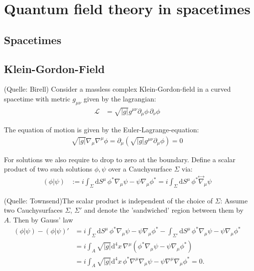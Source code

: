 \chapter{Quantum field theory in spacetimes}
\section{Spacetimes}

\section{Klein-Gordon-Field}
(Quelle: Birell)
Consider a massless complex Klein-Gordon-field in a curved spacetime with metric \(g_{\mu\nu}\) given by the lagrangian:
\begin{align}
\mathcal{L} &= \sqrt{|g|} g^{\mu\nu} \partial_\mu \phi\,\partial_\nu \phi 
\end{align}

The equation of motion is given by the Euler-Lagrange-equation:
\begin{align}
\sqrt{|g|}\nabla_\mu\nabla^\mu \phi = \partial_\mu \left(\sqrt{|g|} g^{\mu\nu} \partial_\mu \phi\right) = 0
\end{align}

For solutions we also require to drop to zero at the boundary. Define a scalar product of two such solutions $\phi, \psi$ over a Cauchysurface \(\Sigma\) via:
\begin{align}
(\phi|\psi) &:= i \int_{\Sigma} \mathrm{d}S^\mu\, \phi^*\nabla_\mu \psi - \psi\nabla_\mu \phi^* = i \int_{\Sigma} \mathrm{d}S^\mu\, \phi^*\overset{\leftrightarrow}{\nabla}_\mu \psi
\end{align}

(Quelle: Townsend)The scalar product is independent of the choice of \(\Sigma\): Assume two Cauchysurfaces \(\Sigma\), \(\Sigma'\) and denote the 'sandwiched' region between them by \(A\). Then by Gauss' law
\begin{align}
(\phi|\psi) - (\phi|\psi)' &= i\int_{\Sigma}\mathrm{d}S^\mu\, \phi^*\nabla_\mu \psi - \psi\nabla_\mu \phi^* - \int_{\Sigma'}\mathrm{d}S^\mu\, \phi^*\nabla_\mu \psi - \psi\nabla_\mu \phi^*\\
	&= i\int_{A} \sqrt{|g|} \mathrm{d^4}x\,\nabla^\mu \left(\phi^*\nabla_\mu \psi - \psi\nabla_\mu \phi^*\right)\\
	&= i\int_{A} \sqrt{|g|} \mathrm{d^4}x\,\phi^*\nabla^\mu\nabla_\mu \psi - \psi \nabla^\mu\nabla_\mu\phi^* = 0.
\end{align}

